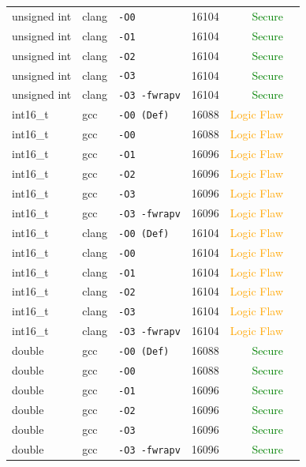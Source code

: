 \begin{table}[htbp]
\begin{tabular}{@{}lllcrl@{}}
unsigned int & clang & \texttt{-O0} & 16104 & \textcolor{green}{Secure}} \\
unsigned int & clang & \texttt{-O1} & 16104 & \textcolor{green}{Secure}} \\
unsigned int & clang & \texttt{-O2} & 16104 & \textcolor{green}{Secure}} \\
unsigned int & clang & \texttt{-O3} & 16104 & \textcolor{green}{Secure}} \\
unsigned int & clang & \texttt{-O3 -fwrapv} & 16104 & \textcolor{green}{Secure}} \\
\midrule
int16\_t & gcc & \texttt{-O0 (Def)} & 16088 & \textcolor{orange}{Logic Flaw} \\
int16\_t & gcc & \texttt{-O0} & 16088 & \textcolor{orange}{Logic Flaw} \\
int16\_t & gcc & \texttt{-O1} & 16096 & \textcolor{orange}{Logic Flaw} \\
int16\_t & gcc & \texttt{-O2} & 16096 & \textcolor{orange}{Logic Flaw} \\
int16\_t & gcc & \texttt{-O3} & 16096 & \textcolor{orange}{Logic Flaw} \\
int16\_t & gcc & \texttt{-O3 -fwrapv} & 16096 & \textcolor{orange}{Logic Flaw} \\
int16\_t & clang & \texttt{-O0 (Def)} & 16104 & \textcolor{orange}{Logic Flaw} \\
int16\_t & clang & \texttt{-O0} & 16104 & \textcolor{orange}{Logic Flaw} \\
int16\_t & clang & \texttt{-O1} & 16104 & \textcolor{orange}{Logic Flaw} \\
int16\_t & clang & \texttt{-O2} & 16104 & \textcolor{orange}{Logic Flaw} \\
int16\_t & clang & \texttt{-O3} & 16104 & \textcolor{orange}{Logic Flaw} \\
int16\_t & clang & \texttt{-O3 -fwrapv} & 16104 & \textcolor{orange}{Logic Flaw} \\
\midrule
double & gcc & \texttt{-O0 (Def)} & 16088 & \textcolor{green}{Secure}} \\
double & gcc & \texttt{-O0} & 16088 & \textcolor{green}{Secure}} \\
double & gcc & \texttt{-O1} & 16096 & \textcolor{green}{Secure}} \\
double & gcc & \texttt{-O2} & 16096 & \textcolor{green}{Secure}} \\
double & gcc & \texttt{-O3} & 16096 & \textcolor{green}{Secure}} \\
double & gcc & \texttt{-O3 -fwrapv} & 16096 & \textcolor{green}{Secure}} \\

\end{tabular}
\end{table}
